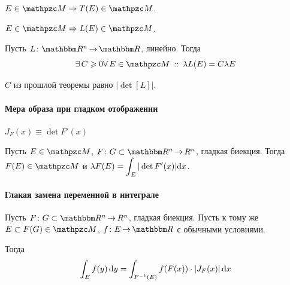 \documentclass[draft, timbord]{longnotes}
\begin{document}
\begin{stat}\label{stat:meas::aff::shiftmeas}
  $E \in \lebesgue \Rightarrow T(E) \in \lebesgue$. 
\end{stat}
\begin{stat}\label{stat:meas::aff::linmeas}
  $E \in \lebesgue \Rightarrow L(E) \in \lebesgue$. 
\end{stat}

\begin{stat}\label{stat:meas::aff::disturb}
  Пусть $L \colon \R^n \to \R$, линейно. Тогда 
  \[
    \exists\, C \geqslant 0 \forall\, E \in \lebesgue \holds \lambda L(E) = C \lambda E
  \]
\end{stat}

\begin{thrm}\label{thrm:meas::aff::deter}
  $C$ из прошлой теоремы равно $\bigl|\det [L]\bigr|$.
\end{thrm}

\paragraph{Мера образа при гладком отображении}
\label{par:meas::smoothimgmeas}

{\denot $J_F(x) \equiv \det F'(x)$}

\begin{thrm}\label{thrm:meas::smoothimgmeas}
  Пусть $E \in \lebesgue$, $F \colon G \subset \R^n \to R^n$, гладкая биекция.
  Тогда $F(E) \in \lebesgue$ и $\lambda F(E) = \displaystyle\int_E |\det F'(x) |\mathrm{d} x$.
\end{thrm}
\begin{tproof}
  \sour\underdev
\end{tproof}


\paragraph{Глакая замена переменной в интеграле}
\label{par:meas::smoothvarch}

\begin{thrm}\label{thrm:meas::smoothvarch}
  Пусть $F \colon G \subset \R^n \to R^n$, гладкая биекция.
  Пусть к тому же $E \subset F(G) \in \lebesgue$, $f\colon E \to \R$ с обычными условиями.

  Тогда\[
    \int_E f(y) \, \mathrm{d} y = \int_{F^{-1}(E)} f(F(x)) \cdot| J_F(x) | \, \mathrm{d} x
  \]
\end{thrm}
\end{document}
